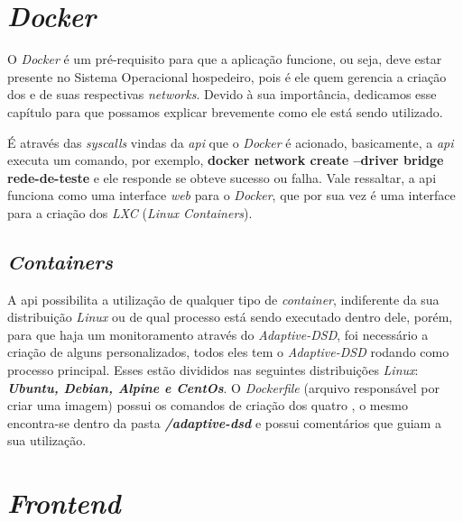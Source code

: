 \section{\textit{Docker}}
\label{sec:docker}

O \textit{Docker} é um pré-requisito para que a aplicação funcione, ou seja, deve estar presente no Sistema Operacional hospedeiro, pois é ele quem gerencia a criação dos \containers{} e de suas respectivas \textit{networks}. Devido à sua importância, dedicamos esse capítulo para que possamos explicar brevemente como ele está sendo utilizado.

É através das \textit{syscalls} vindas da \textit{api} que o \textit{Docker} é acionado, basicamente, a \textit{api} executa um comando, por exemplo, \textbf{docker network create --driver bridge rede-de-teste} e ele responde se obteve sucesso ou falha. Vale ressaltar, a api funciona como uma interface \textit{web} para o \textit{Docker}, que por sua vez é uma interface para a criação dos \textit{LXC} (\textit{Linux Containers}).

\subsection{\textit{Containers}}
\label{subsec:containers}

A api possibilita a utilização de qualquer tipo de \textit{container}, indiferente da sua distribuição \textit{Linux} ou de qual processo está sendo executado dentro dele, porém, para que haja um monitoramento através do \textit{Adaptive-DSD}, foi necessário a criação de alguns \containers{} personalizados, todos eles tem o \textit{Adaptive-DSD} rodando como processo principal. Esses \containers{} estão divididos nas seguintes distribuições \textit{Linux}: \textbf{\textit{Ubuntu, Debian, Alpine e CentOs}}. O \textit{Dockerfile} (arquivo responsável por criar uma imagem) possui os comandos de criação dos quatro \containers{}, o mesmo encontra-se dentro da pasta \textbf{\textit{/adaptive-dsd}} e possui comentários que guiam a sua utilização.



\section{\textit{Frontend}}
\label{sec:frontend}


